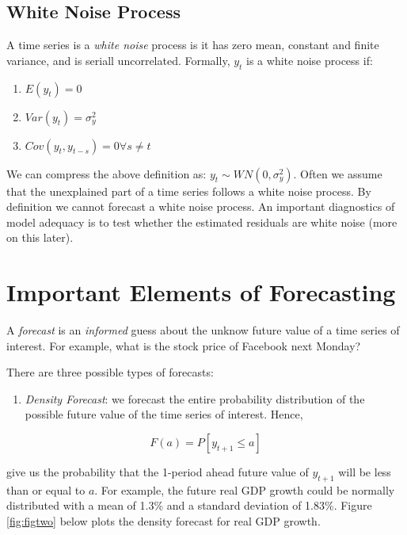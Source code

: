 \documentclass[]{book}
\providecommand{\tightlist}{%
  \setlength{\itemsep}{0pt}\setlength{\parskip}{0pt}}
\theoremstyle{definition}
\theoremstyle{definition}
\theoremstyle{definition}
\theoremstyle{remark}
\let\BeginKnitrBlock\begin \let\EndKnitrBlock\end
\begin{document}
\subsection{White Noise Process}\label{white-noise-process}

A time series is a \emph{white noise} process is it has zero mean,
constant and finite variance, and is seriall uncorrelated. Formally,
\(y_t\) is a white noise process if:

\begin{enumerate}
\def\labelenumi{\arabic{enumi}.}
\tightlist
\item
  \(E(y_t)=0\)
\item
  \(Var(y_t)=\sigma^2_y\)
\item
  \(Cov(y_t,y_{t-s})= 0 \forall s\neq t\)
\end{enumerate}

We can compress the above definition as: \(y_t\sim WN(0,\sigma^2_y)\).
Often we assume that the unexplained part of a time series follows a
white noise process. By definition we cannot forecast a white noise
process. An important diagnostics of model adequacy is to test whether
the estimated residuals are white noise (more on this later).

\section{Important Elements of
Forecasting}\label{important-elements-of-forecasting}

\BeginKnitrBlock{definition}[Forecast]
\protect\hypertarget{def:d1}{}{\label{def:d1} \iffalse (Forecast) \fi{} }
\EndKnitrBlock{definition} A \emph{forecast} is an \emph{informed} guess
about the unknow future value of a time series of interest. For example,
what is the stock price of Facebook next Monday?

There are three possible types of forecasts:

\begin{enumerate}
\def\labelenumi{\arabic{enumi}.}
\tightlist
\item
  \emph{Density Forecast}: we forecast the entire probability
  distribution of the possible future value of the time series of
  interest. Hence,
\end{enumerate}

\begin{equation}
F(a)=P[y_{t+1}\leq a]
\end{equation}

give us the probability that the 1-period ahead future value of
\(y_{t+1}\) will be less than or equal to \(a\). For example, the future
real GDP growth could be normally distributed with a mean of 1.3\% and a
standard deviation of 1.83\%. Figure \ref{fig:figtwo} below plots the
density forecast for real GDP growth.
\end{document}
